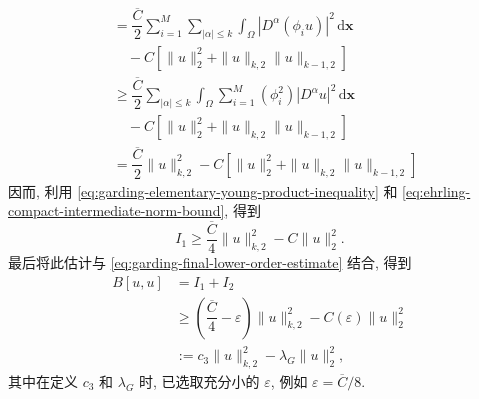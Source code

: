 \begin{Proof}
\[\begin{aligned}
&=\dfrac{\overline C}{2}\sum_{i=1}^M\sum_{|\alpha|\leq k}\int_\Omega|D^\alpha(\phi_i u)|^2\,\mathrm{d}\bm{x}\\
&\quad-C[\|u\|_2^2+\|u\|_{k,2}\|u\|_{k-1,2}]\\
&\geq\dfrac{\overline C}{2}\sum_{|\alpha|\leq k}\int_\Omega\sum_{i=1}^M(\phi_i^2)|D^\alpha u|^2\,\mathrm{d}\bm{x}\\
&\quad-C[\|u\|_2^2+\|u\|_{k,2}\|u\|_{k-1,2}]\\
&=\dfrac{\overline C}{2}\|u\|_{k,2}^2-C[\|u\|_2^2+\|u\|_{k,2}\|u\|_{k-1,2}]
\end{aligned}\]因而, 利用 \eqref{eq:garding-elementary-young-product-inequality} 和 \eqref{eq:ehrling-compact-intermediate-norm-bound}, 得到
\begin{equation}\label{eq:garding-global-principal-part-lower-bound}
I_1\geq\dfrac{\overline C}{4}\|u\|_{k,2}^2-C\|u\|_2^2.
\end{equation}
最后将此估计与 \eqref{eq:garding-final-lower-order-estimate} 结合, 得到\[\begin{aligned}
B[u,u]&=I_1+I_2\\
&\geq\left(\dfrac{\overline C}{4}-\varepsilon\right)\|u\|_{k,2}^2-C(\varepsilon)\|u\|_2^2\\
&:=c_3\|u\|_{k,2}^2-\lambda_G\|u\|_2^2,
\end{aligned}\]其中在定义 $c_3$ 和 $\lambda_G$ 时, 已选取充分小的 $\varepsilon$, 例如 $\varepsilon=\overline C/8$.
\end{Proof}
\endgroup
